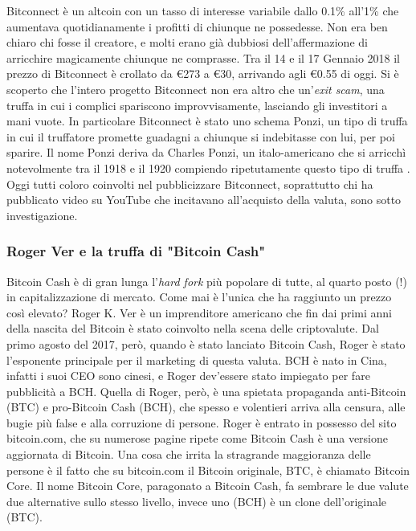 \documentclass {article}
\begin{document}
Bitconnect è un altcoin con un tasso di interesse variabile dallo 0.1\% all'1\% che aumentava quotidianamente i profitti di chiunque ne possedesse.
Non era ben chiaro chi fosse il creatore, e molti erano già dubbiosi dell'affermazione di arricchire magicamente chiunque ne comprasse.
Tra il 14 e il 17 Gennaio 2018 il prezzo di Bitconnect è crollato da \euro{273} a \euro{30}, arrivando agli \euro{0.55} di oggi.
Si è scoperto che l'intero progetto Bitconnect non era altro che un'\textit{exit scam}, una truffa in cui i complici spariscono improvvisamente, lasciando gli investitori a mani vuote.
In particolare Bitconnect è stato uno schema Ponzi, un tipo di truffa in cui il truffatore promette guadagni a chiunque si indebitasse con lui, per poi sparire.
Il nome Ponzi deriva da Charles Ponzi, un italo-americano che si arricchì notevolmente tra il 1918 e il 1920 compiendo ripetutamente questo tipo di truffa \cite{ponzi}.
Oggi tutti coloro coinvolti nel pubblicizzare Bitconnect, soprattutto chi ha pubblicato video su YouTube che incitavano all'acquisto della valuta, sono sotto investigazione.


\subsubsection {Roger Ver e la truffa di "Bitcoin Cash"}


Bitcoin Cash è di gran lunga l'\textit{hard fork} più popolare di tutte, al quarto posto (!) in capitalizzazione di mercato. Come mai è l'unica che ha raggiunto un prezzo così elevato?
Roger K. Ver è un imprenditore americano che fin dai primi anni della nascita del Bitcoin è stato coinvolto nella scena delle criptovalute.
Dal primo agosto del 2017, però, quando è stato lanciato Bitcoin Cash, Roger è stato l'esponente principale per il marketing di questa valuta. BCH è nato in Cina, infatti i suoi CEO sono cinesi, e Roger dev'essere stato impiegato per fare pubblicità a BCH.
Quella di Roger, però, è una spietata propaganda anti-Bitcoin (BTC) e pro-Bitcoin Cash (BCH), che spesso e volentieri arriva alla censura, alle bugie più false e alla corruzione di persone.
Roger è entrato in possesso del sito bitcoin.com, che su numerose pagine ripete come Bitcoin Cash è una versione aggiornata di Bitcoin. Una cosa che irrita la stragrande maggioranza delle persone è il fatto che su bitcoin.com il Bitcoin originale, BTC, è chiamato Bitcoin Core.
Il nome Bitcoin Core, paragonato a Bitcoin Cash, fa sembrare le due valute due alternative sullo stesso livello, invece uno (BCH) è un clone dell'originale (BTC).
\end{document}
